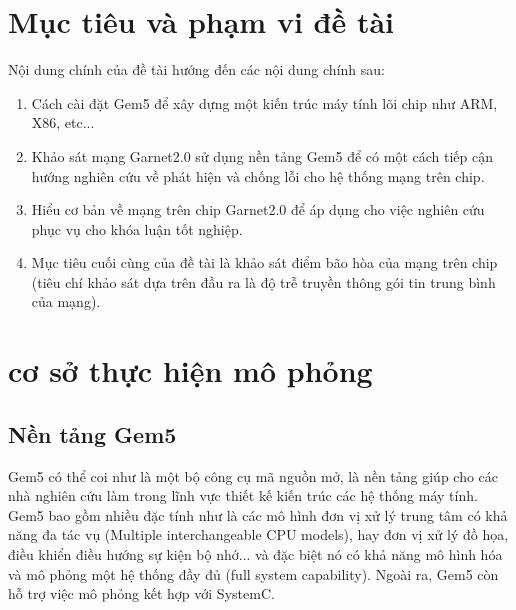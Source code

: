\documentclass{article}
\begin{document}
\section{Mục tiêu và phạm vi đề tài}
Nội dung chính của đề tài hướng đến các nội dung chính sau:
	\begin{enumerate}
		\item Cách cài đặt Gem5 để xây dựng một kiến trúc máy tính lõi chip như ARM, X86, etc...
		\item Khảo sát mạng Garnet2.0 sử dụng nền tảng Gem5 để có một cách tiếp cận hướng nghiên cứu về phát hiện và chống lỗi cho hệ thống mạng trên chip.
		\item Hiểu cơ bản về mạng trên chip Garnet2.0 để áp dụng cho việc nghiên cứu phục vụ cho khóa luận tốt nghiệp.
		\item Mục tiêu cuối cùng của đề tài là khảo sát điểm bão hòa của mạng trên chip (tiêu chí khảo sát dựa trên đầu ra là độ trễ truyền thông gói tin trung bình của mạng).
	\end{enumerate}

\section{cơ sở thực hiện mô phỏng}
\subsection{Nền tảng Gem5}
Gem5 có thể coi như là một bộ công cụ mã nguồn mở, là nền tảng giúp cho các nhà nghiên cứu làm trong lĩnh vực thiết kế kiến trúc các hệ thống máy tính. Gem5 bao gồm nhiều đặc tính như là các mô hình đơn vị xử lý trung tâm có khả năng đa tác vụ (Multiple interchangeable CPU models), hay đơn vị xử lý đồ họa, điều khiển điều hướng sự kiện bộ nhớ... và đặc biệt nó có khả năng mô hình hóa và mô phỏng một hệ thống đầy đủ (full system capability). Ngoài ra, Gem5 còn hỗ trợ việc mô phỏng kết hợp với SystemC.
\end{document}
